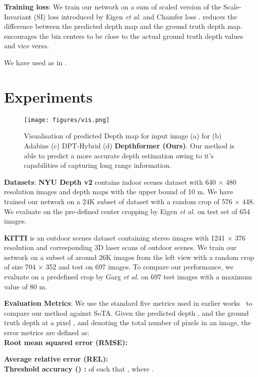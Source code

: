 \documentclass{article}
\newcommand{\myfirstpara}[1]{\noindent \textbf{#1}:}
\newcommand{\mypara}[1]{\vspace{0.5em} \myfirstpara{#1}}
\newcommand{\etal}{\textit{et al.}\xspace}
\begin{document}
\mypara{Training loss}
We train our network on a sum of scaled version of the Scale-Invariant (SI)  loss introduced by Eigen \etal \cite{eigen}  and Chamfer loss  \cite{adabins}.  reduces the difference between the predicted depth map and the ground truth depth map.  encourages  the bin centers to be close to the actual ground truth depth values and vice versa.

We have used  as in \cite{adabins}.
 
\section{Experiments}
\label{sec:experiments}

\begin{figure*}[h]
    \centering
    \texttt{[image: figures/vis.png]}
    \caption{\small Visualisation of predicted Depth map for input image (a) for (b) Adabins \cite{adabins} (c) DPT-Hybrid \cite{dense} (d) \textbf{Depthformer (Ours)}. Our method is able to predict a more accurate depth estimation owing to it's capabilities of capturing long range information.}
    \label{fig:vis}
\end{figure*}

\mypara{Datasets} 
\textbf{NYU Depth v2} \cite{nyu} contains indoor scenes dataset with 640 × 480 resolution images and depth maps with the upper bound of 10 m. We have trained our network on a 24K subset of dataset with a random crop of 576 × 448. We evaluate on the pre-defined center cropping by Eigen \etal \cite{eigen} on test set of 654 images. 

\textbf{KITTI} \cite{kitti} is an outdoor scenes dataset containing stereo images with 1241 × 376 resolution and corresponding 3D laser scans of outdoor scenes. We train our network on a subset of around 26K images from the left view with a random crop of size 704 × 352 and test on 697 images. To compare our performance, we evaluate on a predefined crop by Garg \etal \cite{garg} on 697 test images with a maximum value of 80 m.

\mypara{Evaluation Metrics} 
We use the standard five metrics used in earlier works~\cite{eigen} to compare our method against SoTA. Given the predicted depth , and the ground truth depth  at a pixel , and  denoting the total number of pixels in an image, the error metrics are defined as: \\ \textbf{Root mean squared error (RMSE):} \begin{small} 

\end{small}  
\textbf{Average relative error (REL):}  \\ 
\textbf{Threshold accuracy () :} 
 of  such that , where .  
\end{document}
